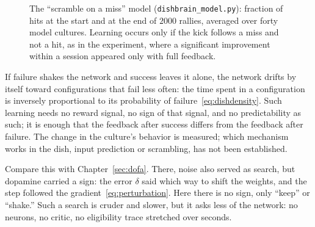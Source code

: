 \begin{figure}[t]
\centering
{}
\caption{The ``scramble on a miss'' model (\texttt{dishbrain\_model.py}): fraction of hits at the start and at the end of $2000$ rallies, averaged over forty model cultures. Learning occurs only if the kick follows a miss and not a hit, as in the experiment, where a significant improvement within a session appeared only with full feedback.}
\label{fig:dishmodel}
\end{figure}

\begin{keyblock}
\begin{proposition}
\label{prop:dishscramble}
If failure shakes the network and success leaves it alone, the network drifts by itself toward configurations that fail less often: the time spent in a configuration is inversely proportional to its probability of failure~\eqref{eq:dishdensity}. Such learning needs no reward signal, no sign of that signal, and no predictability as such; it is enough that the feedback after success differs from the feedback after failure. The change in the culture's behavior is measured; which mechanism works in the dish, input prediction or scrambling, has not been established.
\end{proposition}
\end{keyblock}

Compare this with Chapter~\ref{sec:dofa}. There, noise also served as search, but dopamine carried a sign: the error $\delta$ said which way to shift the weights, and the step followed the gradient~\eqref{eq:perturbation}. Here there is no sign, only ``keep'' or ``shake.'' Such a search is cruder and slower, but it asks less of the network: no  neurons, no critic, no eligibility trace stretched over seconds.

